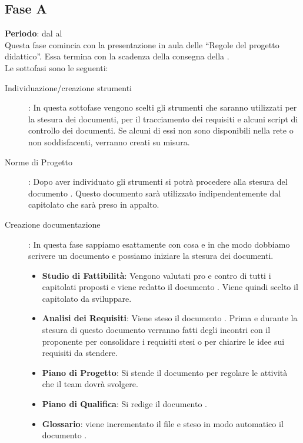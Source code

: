 \subsection{Fase A}
	\textbf{Periodo}: dal  al  \\
	Questa fase comincia con la presentazione in aula delle “Regole del progetto didattico”. Essa termina con la scadenza della consegna della .\\Le sottofasi sono le seguenti:
	\begin{description}
		\item[Individuazione/creazione strumenti]: In questa sottofase vengono scelti gli strumenti che saranno utilizzati per la stesura dei documenti, per il tracciamento dei requisiti e alcuni script di controllo dei documenti. Se alcuni di essi non sono disponibili nella rete o non soddisfacenti, verranno creati su misura.
		\item[Norme di Progetto]: Dopo aver individuato gli strumenti si potrà procedere alla stesura del documento . Questo documento sarà utilizzato indipendentemente dal capitolato che sarà preso in appalto.
		\item[Creazione documentazione]: In questa fase sappiamo esattamente con cosa e in che modo dobbiamo scrivere un documento e possiamo iniziare la stesura dei documenti.
			\begin{itemize}
				\item \textbf{Studio di Fattibilità}: Vengono valutati pro e contro di tutti i capitolati proposti e viene redatto il documento . Viene quindi scelto il capitolato da sviluppare.
				\item \textbf{Analisi dei Requisiti}: Viene steso il documento . Prima e durante la stesura di questo documento verranno fatti degli incontri con il proponente per consolidare i requisiti stesi o per chiarire le idee sui requisiti da stendere.
				\item \textbf{Piano di Progetto}: Si stende il documento  per regolare le attività che il team dovrà svolgere.
				\item \textbf{Piano di Qualifica}: Si redige il documento .
				\item \textbf{Glossario}: viene incrementato il file   e steso in modo automatico il documento .
			\end{itemize}
	\end{description}
